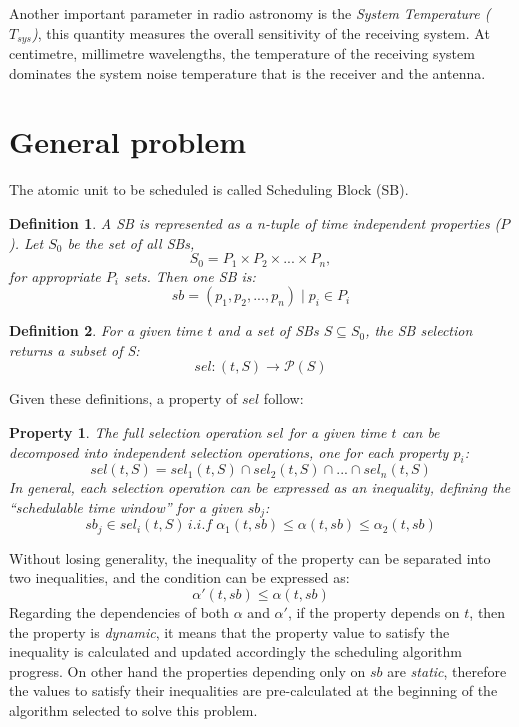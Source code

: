 Another important parameter in radio astronomy is the \textit{System Temperature ($T_{sys}$)}, this quantity measures the overall sensitivity of the receiving system. At centimetre, millimetre wavelengths, the temperature of the receiving system dominates the system noise temperature that is the receiver and the antenna.

\section{General problem}
\newtheorem{problem-def}{Definition}
The atomic unit to be scheduled is called Scheduling Block (SB).

\begin{problem-def}
A SB is represented as a n-tuple of time independent  properties ($P$). Let $S_0$ be the set of all SBs,
$$S_0 = P_1 \times P_2 \times ... \times P_n,$$
for appropriate $P_i$ sets. Then one SB is:
$$sb = (p_1, p_2, ..., p_n) \mid p_i \in P_i$$
\end{problem-def} 

\begin{problem-def}
For a given time $t$ and a set of SBs $S \subseteq S_0$, the SB selection returns a subset of S:
$$sel:(t,S) \rightarrow \mathcal P \left({S}\right)$$
\end{problem-def}

Given these definitions, a property of $sel$ follow:

\newtheorem{sel-props}{Property}
\begin{sel-props}
The full selection operation $sel$ for a given time $t$ can be decomposed into independent selection operations, one for each property $p_i$:
$$sel(t,S) = sel_1(t, S) \cap sel_2(t, S) \cap ... \cap sel_n(t,S)$$
In general, each selection operation can be expressed as an inequality, defining the ``schedulable time window'' for a given $sb_j$:
$$sb_j \in sel_i(t, S)\,i.i.f\;\alpha_1(t, sb) \leq \alpha(t, sb) \leq \alpha_2(t, sb)$$
\end{sel-props}

Without losing generality, the inequality of the property can be separated into two inequalities, and the condition can be expressed as: 
$$\alpha'(t, sb) \leq \alpha (t, sb)$$
Regarding the dependencies of both $\alpha$ and $\alpha'$, if the property depends on $t$, then the property is \textit{dynamic}, it means that the property value to satisfy the inequality is calculated and updated accordingly the scheduling algorithm progress. On other hand the properties depending only on $sb$ are \textit{static}, therefore the values to satisfy their inequalities are pre-calculated at the beginning of the algorithm selected to solve this problem.

